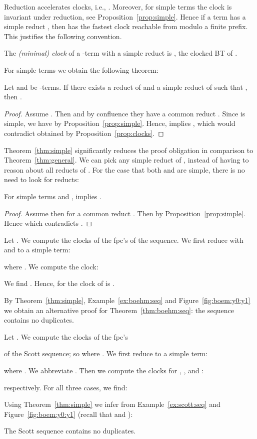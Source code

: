 Reduction accelerates clocks, i.e., .
Moreover, for simple terms the clock is invariant under reduction, see Proposition~\ref{prop:simple}.
Hence if a term  has a simple reduct , then  has the fastest clock reachable from  
modulo a finite prefix. This justifies the following convention.
\begin{convention}
  The \emph{(minimal) clock} of a -term  with a simple reduct 
  is , the clocked BT of .
\end{convention}


For simple terms we obtain the following theorem:
\begin{theorem}\label{thm:simple}
  Let  and  be -terms.
  If there exists a reduct  of 
  and a simple reduct  of  such that
  , then .
\end{theorem}
\begin{proof}
  Assume . Then  and by confluence they have a common reduct
  .
  Since  is simple, we have  by Proposition~\ref{prop:simple}.
Hence,  implies ,
  which would contradict  obtained by Proposition~\ref{prop:clocks}.
\end{proof}
Theorem~\ref{thm:simple} significantly reduces 
the proof obligation in comparison to Theorem~\ref{thm:general}.
We can pick any simple reduct  of ,
instead of having to reason about all reducts  of .
For the case that both  and  are simple, there is no need to look for reducts:
\begin{proposition}\label{cor:simple:simple}
  For simple terms  and ,
   implies .
\end{proposition}
\begin{proof}
  Assume  then  for a common reduct .
  Then  by Proposition~\ref{prop:simple}. 
  Hence  which contradicts .
\end{proof}

\begin{example}\label{ex:boehm:seq}
  Let .
  We compute the clocks of the fpc's 
   of the \boehm{} sequence.
We first reduce 
  with 
  and  to a simple term:
  
  where .
  We compute the clock:
  
  We find 
  .
  Hence, for  the clock of  is .
\end{example}
\noindent
By Theorem~\ref{thm:simple}, Example~\ref{ex:boehm:seq}
and Figure~\ref{fig:boem:y0:y1} we obtain an alternative 
proof for Theorem~\ref{thm:boehm:seq}: the \boehm{} sequence contains no duplicates.

\begin{example}\label{ex:scott:seq}
  Let .
  We compute the clocks of the fpc's 
  
  of the Scott sequence; so where .
  We first reduce  to a simple term:
  
  where .
  We abbreviate .
  Then we compute the clocks for , , and :
  
  respectively.
  For all three cases, we find: 
\end{example}
\noindent
Using Theorem~\ref{thm:simple} we infer from Example~\ref{ex:scott:seq}
and Figure~\ref{fig:boem:y0:y1} (recall that  and ):
\begin{corollary}
  The Scott sequence contains no duplicates.  
\end{corollary}

